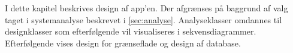 I dette kapitel beskrives design af app'en. Der afgrænses på baggrund af valg taget i systemanalyse beskrevet i \autoref{sec:analyse}. Analyseklasser omdannes til designklasser som efterfølgende vil visualiseres i sekvensdiagrammer. Efterfølgende vises design for grænseflade og design af database. 





